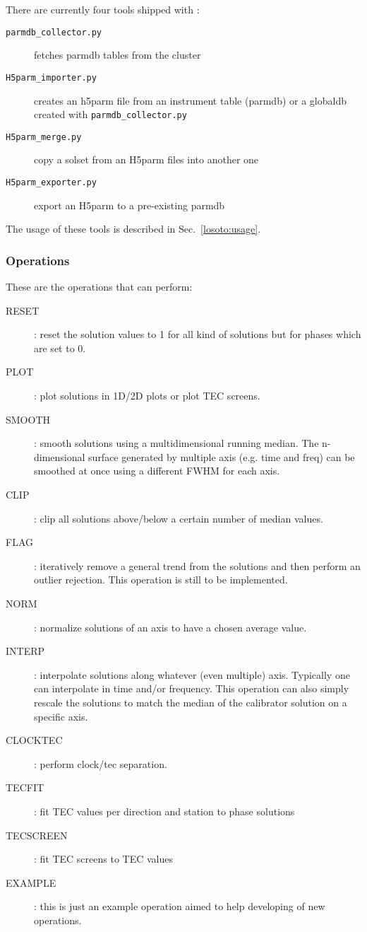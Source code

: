 \documentclass[structabstract]{article}
\begin{document}
There are currently four tools shipped with \losoto{}:
\begin{description}
 \item[\texttt{parmdb\_collector.py}] fetches parmdb tables from the cluster
 \item[\texttt{H5parm\_importer.py}] creates an h5parm file from an instrument table (parmdb) or a globaldb created with \texttt{parmdb\_collector.py}
 \item[\texttt{H5parm\_merge.py}] copy a solset from an H5parm files into another one
 \item[\texttt{H5parm\_exporter.py}] export an H5parm to a pre-existing parmdb
\end{description}

The usage of these tools is described in Sec.~\ref{losoto:usage}.

\subsubsection{Operations}
\label{losoto:operations}

These are the operations that \losoto{} can perform:
\begin{description}
 \item[RESET]: reset the solution values to 1 for all kind of solutions but for phases which are set to 0.
 \item[PLOT]: plot solutions in 1D/2D plots or plot TEC screens.
 \item[SMOOTH]: smooth solutions using a multidimensional running median. The n-dimensional surface generated by multiple axis (e.g. time and freq) can be smoothed at once using a different FWHM for each axis.
 \item[CLIP]: clip all solutions above/below a certain number of median values.
 \item[FLAG]: iteratively remove a general trend from the solutions and then perform an outlier rejection. This operation is still to be implemented.
 \item[NORM]: normalize solutions of an axis to have a chosen average value.
 \item[INTERP]: interpolate solutions along whatever (even multiple) axis. Typically one can interpolate in time and/or frequency. This operation can also simply rescale the solutions to match the median of the calibrator solution on a specific axis.
 \item[CLOCKTEC]: perform clock/tec separation.
 \item[TECFIT]: fit TEC values per direction and station to phase solutions
 \item[TECSCREEN]: fit TEC screens to TEC values
 \item[EXAMPLE]: this is just an example operation aimed to help developing of new operations.
\end{description}
\end{document}
